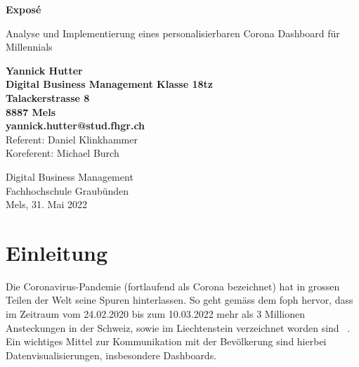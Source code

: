 \documentclass[12pt, oneside]{article}
\begin{document}
\begin{titlepage}
    \begin{center}
        \Huge
        \textbf{Exposé}

        \vspace{0.5cm}
        \LARGE
        Analyse und Implementierung eines personalisierbaren Corona Dashboard für Millennials

        \vspace{1.5cm}
        \normalsize
        \textbf{Yannick Hutter}\\
        \textbf{Digital Business Management Klasse 18tz}\\
        \textbf{Talackerstrasse 8}\\
        \textbf{8887 Mels}\\
        \textbf{yannick.hutter@stud.fhgr.ch}\\


        \vfill
        Referent: Daniel Klinkhammer\\
        Koreferent: Michael Burch\\

        \vspace{0.8cm}


        Digital Business Management\\
        Fachhochschule Graubünden\\
        Mels, 31. Mai 2022
    \end{center}
\end{titlepage}



\tableofcontents
\listoffigures
\listoftables

\clearpage
\printglossaries



\clearpage
{}
\setcounter{page}{3}

\section{Einleitung}
Die Coronavirus-Pandemie (fortlaufend als Corona bezeichnet) hat in grossen Teilen der Welt seine Spuren hinterlassen. So geht gemäss dem \Gls{foph} hervor, dass im Zeitraum vom 24.02.2020 bis zum 10.03.2022 mehr als 3 Millionen Ansteckungen in der Schweiz, sowie im Liechtenstein verzeichnet worden sind ~\citep{FOPH.13.03.2022}. Ein wichtiges Mittel zur Kommunikation mit der Bevölkerung sind hierbei Datenvisualisierungen, insbesondere Dashboards.\\
\end{document}
